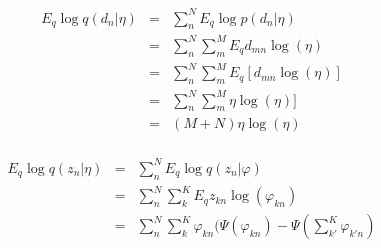 \documentclass[]{article}
\begin{document}
\begin{eqnarray}
E_q \log q(d_n | \eta) 
&=& \sum\limits_{n}^{N} E_q \log p(d_n | \eta) \\
&=& \sum\limits_{n}^{N} \sum\limits_{m}^{M} E_q d_{mn} \log(\eta) \\
&=& \sum\limits_{n}^{N} \sum\limits_{m}^{M} E_q [d_{mn} \log(\eta)] \\
&=& \sum\limits_{n}^{N} \sum\limits_{m}^{M} \eta \log(\eta)] \\
&=& (M + N)\eta \log(\eta) \\
\end{eqnarray}

\begin{eqnarray}
E_q \log q(z_n | \eta) 
&=& \sum\limits_{n}^{N} E_q \log q(z_n | \varphi) \\
&=& \sum\limits_{n}^{N} \sum\limits_{k}^{K} E_q z_{kn} \log(\varphi_{kn}) \\
&=& \sum\limits_{n}^{N} \sum\limits_{k}^{K} \varphi_{kn} (\Psi(\varphi_{kn}) - \Psi(\sum\limits_{k'}^{K} \varphi_{k'n})\\
\end{eqnarray}

\newpage
\end{document}

